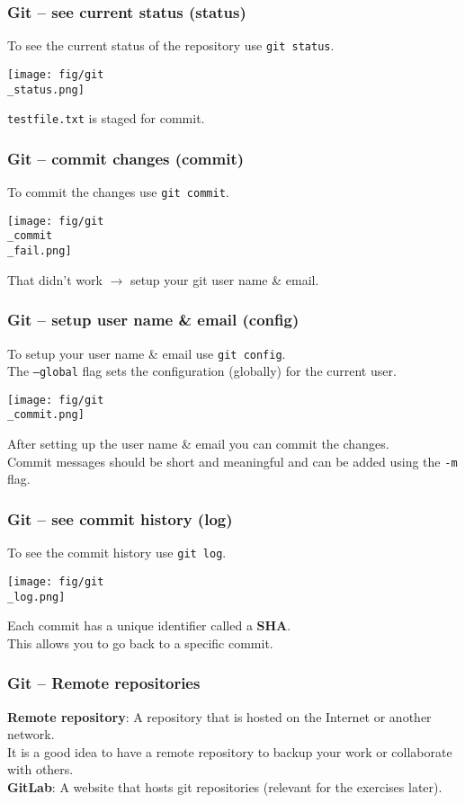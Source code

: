 \documentclass{beamer}
\begin{document}
\begin{frame}
  \frametitle{Git -- see current status (status)}
  To see the current status of the repository use \texttt{git status}.\\
  \begin{center}
    \texttt{[image: fig/git\\\_status.png]}
   \end{center}
  \texttt{testfile.txt} is staged for commit.\\
\end{frame}
\begin{frame}
  \frametitle{Git -- commit changes (commit)}
  To commit the changes use \texttt{git commit}.\\
  \begin{center}
    \texttt{[image: fig/git\\\_commit\\\_fail.png]}
  \end{center}
  That didn't work $\rightarrow$ setup your git user name \& email.\\
\end{frame}
\begin{frame}
  \frametitle{Git -- setup user name \& email (config)}
  To setup your user name \& email use \texttt{git config}.\\
  The \texttt{--global} flag sets the configuration (globally) for the current user.\\
  \begin{center}
    \texttt{[image: fig/git\\\_commit.png]}
  \end{center}
  After setting up the user name \& email you can commit the changes.\\
  Commit messages should be short and meaningful and can be added using the \texttt{-m} flag.\\
\end{frame}
\begin{frame}
  \frametitle{Git -- see commit history (log)}
  To see the commit history use \texttt{git log}.\\
  \begin{center}
    \texttt{[image: fig/git\\\_log.png]}
  \end{center}
  Each commit has a unique identifier called a \textbf{SHA}.\\
  This allows you to go back to a specific commit.\\
\end{frame}
\begin{frame}
  \frametitle{Git -- Remote repositories}
  \textbf{Remote repository}: A repository that is hosted on the Internet or another network.\\
  \vspace{5mm}
  It is a good idea to have a remote repository to backup your work or collaborate with others.\\
  \vspace{5mm}
  \textbf{GitLab}: A website that hosts git repositories (relevant for the exercises later).\\
\end{frame}
\end{document}
